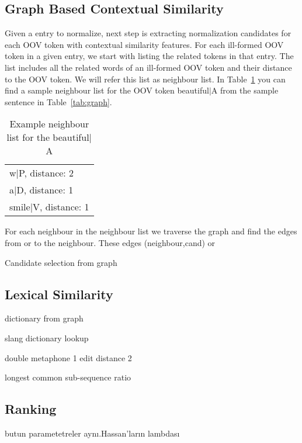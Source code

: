 \subsection{Graph Based Contextual Similarity}

Given a entry to normalize, next step is extracting normalization candidates for each OOV token with contextual similarity features. For each ill-formed OOV token in a given entry, we start with listing the related tokens in that entry. The list includes all the related words of an ill-formed OOV token and their distance to the OOV token. We will refer this list as neighbour list. In Table~\ref{tab:neigh} you can find a sample neighbour list for the OOV token beautiful$|$A from the sample sentence in Table~\ref{tab:graph}.

\begin{table}[hbt]
  \centering
  \begin{tabular}[tc]{l}
    w$|$P, distance: 2 \\
    a$|$D, distance: 1 \\
    smile$|$V, distance: 1 \\
  \end{tabular}
\caption{Example neighbour list for the beautiful$|$A}
\label{tab:neigh}
\end{table}


For each neighbour in the neighbour list we traverse the graph and find the edges from or to the neighbour. These edges (neighbour,cand) or

Candidate selection from graph

\subsection{Lexical Similarity}

dictionary from graph

slang dictionary lookup

double metaphone 1
edit distance 2


longest common sub-sequence ratio



\subsection{Ranking}

butun parametetreler aynı.Hassan'ların lambdası
